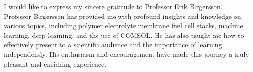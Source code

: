 \noindent I would like to express my sincere gratitude to Professor Erik Birgersson. Professor Birgersson has provided me with profound insights and knowledge on various topics, including polymer electrolyte membrane fuel cell stacks, machine learning, deep learning, and the use of COMSOL. He has also taught me how to effectively present to a scientific audience and the importance of learning independently. His enthusiasm and encouragement have made this journey a truly pleasant and enriching experience.